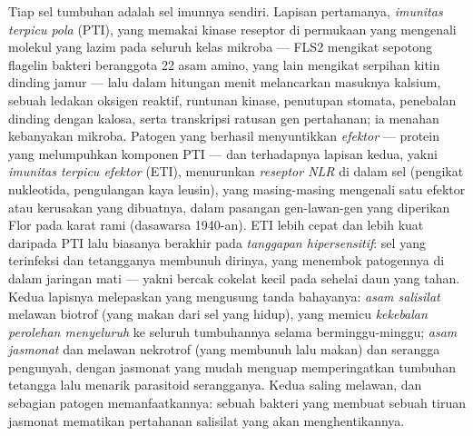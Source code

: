 \begin{definition}\label{def:b3:plant-molecular-physiology:immunity}
%
%
Tiap sel tumbuhan adalah sel imunnya sendiri. Lapisan pertamanya,
\emph{imunitas terpicu pola} (PTI), yang memakai kinase reseptor di
permukaan yang mengenali molekul yang lazim pada seluruh kelas mikroba ---
FLS2 mengikat sepotong flagelin bakteri beranggota 22 asam amino, yang lain mengikat
serpihan kitin dinding jamur --- lalu dalam hitungan menit melancarkan
masuknya kalsium, sebuah ledakan oksigen reaktif, runtunan kinase, penutupan
stomata, penebalan dinding dengan kalosa, serta transkripsi ratusan
gen pertahanan; ia menahan kebanyakan mikroba. Patogen yang berhasil
menyuntikkan \emph{efektor} --- protein yang melumpuhkan komponen PTI --- dan
terhadapnya lapisan kedua, yakni \emph{imunitas terpicu efektor}
(ETI), menurunkan \emph{reseptor NLR} di dalam sel (pengikat nukleotida,
pengulangan kaya leusin), yang masing-masing mengenali satu efektor atau kerusakan yang
dibuatnya, dalam pasangan gen-lawan-gen yang diperikan Flor pada karat rami
(dasawarsa 1940-an). ETI lebih cepat dan lebih kuat daripada PTI lalu biasanya berakhir pada
\emph{tanggapan hipersensitif}: sel yang terinfeksi dan tetangganya
membunuh dirinya, yang menembok patogennya di dalam jaringan mati --- yakni bercak cokelat
kecil pada sehelai daun yang tahan. Kedua lapisnya melepaskan  yang mengusung
tanda bahayanya: \emph{asam salisilat} melawan biotrof (yang makan dari sel yang
hidup), yang memicu \emph{kekebalan perolehan menyeluruh} ke seluruh
tumbuhannya selama berminggu-minggu; \emph{asam jasmonat} dan  melawan nekrotrof
(yang membunuh lalu makan) dan serangga pengunyah, dengan jasmonat yang
mudah menguap memperingatkan tumbuhan tetangga lalu menarik parasitoid
serangganya. Kedua  saling melawan, dan sebagian patogen
memanfaatkannya: sebuah bakteri yang membuat sebuah tiruan jasmonat mematikan
pertahanan salisilat yang akan menghentikannya.
\end{definition}

